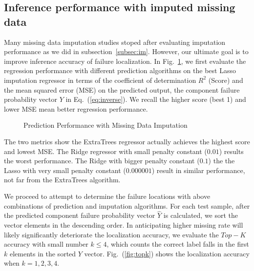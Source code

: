 \subsection{Inference performance with imputed missing data}
Many missing data imputation studies stoped after evaluating imputation performance as we did in subsection~\ref{subsec:im}. 
However, our ultimate goal is to improve inference accuracy of failure localization. In Fig.~\ref{fig:score}, we first evaluate the 
regression performance with different prediction algorithms on the best Lasso imputation regressor in terms of the 
coefficient of determination $R^2$ (Score) and the mean squared error (MSE) on the predicted output, the component 
failure probability vector $Y$ in Eq.~(\ref{eq:inverse}). We recall the higher score (best 1) and lower MSE mean better regression performance. 

  \begin{figure}[!ht]
    \hfill
    \caption{Prediction Performance with Missing Data Imputation}
    \label{fig:score}
  \end{figure}
  
  The two metrics show the ExtraTrees regressor actually achieves the highest score and lowest MSE. The Ridge regressor with 
  small penalty constant ($0.01$) results the worst performance. The Ridge with
  bigger penalty constant ($0.1$) the the Lasso with very small penalty constant ($0.000001$) result in similar performance, 
  not far from the ExtraTrees algorithm. 
  
  We proceed to attempt to determine the failure locations with above combinations of prediction and imputation algorithms.
  For each test sample, after the predicted component failure probability vector $\hat{Y}$ is calculated, we sort the vector 
  elements in the descending order. In anticipating higher missing rate will likely significantly deteriorate the localization accuracy, 
  we evaluate the $Top-K$ accuracy with small number $k\le4$, which counts the correct label falls in the first $k$ elements in the 
  sorted $Y$ vector. Fig.~(\ref{fig:topk}) shows the localization accuracy when $k=1,2,3,4$. 
  
